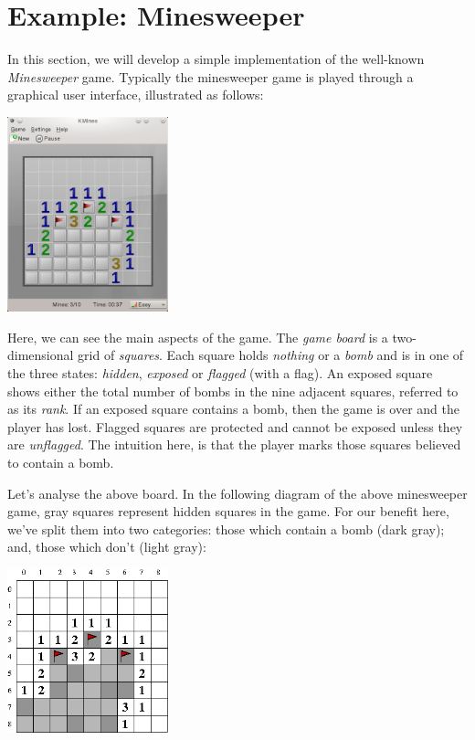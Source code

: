 \newpage
\section{Example: Minesweeper}
In this section, we will develop a simple implementation of the well-known {\em Minesweeper} game.  Typically the minesweeper game is played through a graphical user interface, illustrated as follows:
\begin{center}
\includegraphics[width=0.35\textwidth]{../images/kmines.png}
\end{center}
Here, we can see the main aspects of the game.  The {\em game board} is a two-dimensional grid of {\em squares}.  Each square holds {\em nothing} or a {\em bomb} and is in one of the three states: {\em hidden}, {\em exposed} or {\em flagged} (with a flag).  An exposed square shows either the total number of bombs in the nine adjacent squares, referred to as its {\em rank}.  If an exposed square contains a bomb, then the game is over and the player has lost.  Flagged squares are protected and cannot be exposed unless they are {\em unflagged}.  The intuition here, is that the player marks those squares believed to contain a bomb.  

Let's analyse the above board.  In the following diagram of the above minesweeper game, gray squares represent hidden squares in the game.  For our benefit here, we've split them into two categories: those which contain a bomb (dark gray); and, those which don't (light gray): 

\begin{center}
\includegraphics[width=0.35\textwidth]{../images/kmines_analysis.png}
\end{center}

